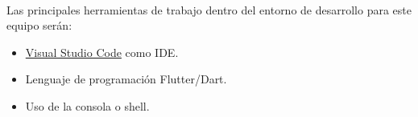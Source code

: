 \paragraph{}Las principales herramientas de trabajo dentro del entorno de desarrollo
para este equipo serán:

\begin{itemize}
    \item \hyperref[sec:vscode]{Visual Studio Code} como \gls{IDE}.
    \item Lenguaje de programación Flutter/Dart.
    \item Uso de la consola o \gls{shell}.
\end{itemize}

